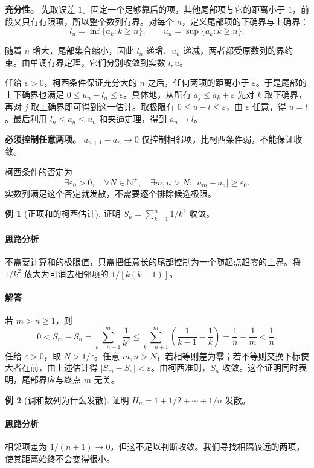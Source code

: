 \documentclass[UTF8,fontset=fandol,12pt,oneside,openany]{ctexrep}
\newcommand{\N}{\mathbb N^{+}}
\theoremstyle{definition}
\newtheorem{example}{例}[chapter]
\begin{document}
\textbf{充分性。} 先取误差 $1$。固定一个足够靠后的项，其他尾部项与它的距离小于 $1$，前段又只有有限项，所以整个数列有界。对每个 $n$，定义尾部项的下确界与上确界：
\[
l_n=\inf\{a_k:k\ge n\},\qquad u_n=\sup\{a_k:k\ge n\}.
\]

随着 $n$ 增大，尾部集合缩小，因此 $l_n$ 递增、$u_n$ 递减，两者都受原数列的界约束。由单调有界定理，它们分别收敛到实数 $l,u$。

任给 $\varepsilon>0$，柯西条件保证充分大的 $n$ 之后，任何两项的距离小于 $\varepsilon$。于是尾部的上下确界也满足 $0\le u_n-l_n\le\varepsilon$。具体地，从所有 $a_j\le a_k+\varepsilon$ 先对 $k$ 取下确界，再对 $j$ 取上确界即可得到这一估计。取极限有 $0\le u-l\le\varepsilon$，由 $\varepsilon$ 任意，得 $u=l$。最后利用 $l_n\le a_n\le u_n$ 和夹逼定理，得到 $a_n\to l$。

\textbf{必须控制任意两项。} $a_{n+1}-a_n\to0$ 仅控制相邻项，比柯西条件弱，不能保证收敛。

柯西条件的否定为
\[
\exists\varepsilon_0>0,\quad \forall N\in\N,\quad
\exists m,n>N:\ |a_m-a_n|\ge\varepsilon_0.
\]
实数列满足这个否定就发散，不需要逐个排除候选极限。

\begin{example}[正项和的柯西估计]
证明 $S_n=\sum_{k=1}^n1/k^2$ 收敛。
\end{example}
\paragraph{思路分析} 不需要计算和的极限值，只需把任意长的尾部控制为一个随起点趋零的上界。将 $1/k^2$ 放大为可消去相邻项的 $1/[k(k-1)]$。
\paragraph{解答} 若 $m>n\ge1$，则
\[
0<S_m-S_n=\sum_{k=n+1}^m\frac1{k^2}
\le\sum_{k=n+1}^m\left(\frac1{k-1}-\frac1k\right)
=\frac1n-\frac1m<\frac1n.
\]
任给 $\varepsilon>0$，取 $N>1/\varepsilon$。任意 $m,n>N$，若相等则差为零；若不等则交换下标使大者在前，由上述估计得 $|S_m-S_n|<\varepsilon$。由柯西准则，$S_n$ 收敛。这个证明同时表明，尾部界应与终点 $m$ 无关。

\begin{example}[调和数列为什么发散]
证明 $H_n=1+1/2+\cdots+1/n$ 发散。
\end{example}

\paragraph{思路分析} 相邻项差为 $1/(n+1)\to0$，但这不足以判断收敛。我们寻找相隔较远的两项，使其距离始终不会变得很小。
\end{document}
